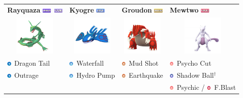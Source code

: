\documentclass[12pt]{beamer}
\newcommand{\flyingfull}{\includegraphics[height=0.2cm]{../../images/type/full/Flying.png}}
\newcommand{\dragonfull}{\includegraphics[height=0.2cm]{../../images/type/full/Dragon.png}}
\newcommand{\groundfull}{\includegraphics[height=0.2cm]{../../images/type/full/Ground.png}}
\newcommand{\psychicfull}{\includegraphics[height=0.2cm]{../../images/type/full/Psychic.png}}
\newcommand{\waterfull}{\includegraphics[height=0.2cm]{../../images/type/full/Water.png}}
\newcommand{\fightingsimp}{\includegraphics[height=0.2cm]{../../images/type/simplified/fighting.png}}
\newcommand{\dragonsimp}{\includegraphics[height=0.2cm]{../../images/type/simplified/dragon.png}}
\newcommand{\ghostsimp}{\includegraphics[height=0.2cm]{../../images/type/simplified/ghost.png}}
\newcommand{\psysimp}{\includegraphics[height=0.2cm]{../../images/type/simplified/psy.png}}
\newcommand{\groundsimp}{\includegraphics[height=0.2cm]{../../images/type/simplified/ground.png}}
\newcommand{\watersimp}{\includegraphics[height=0.2cm]{../../images/type/simplified/water.png}}
\begin{document}
\begin{frame}
\begin{footnotesize}
\begin{block}{}
\begin{center}
\begin{tabular}{p{3cm}p{3cm}p{3cm}p{3cm}} 
\textbf{Rayquaza} \hfill \dragonfull~\flyingfull  & \textbf{Kyogre} \hfill  \waterfull & \textbf{Groudon} \hfill \groundfull & \textbf{Mewtwo} \hfill \psychicfull \\ 
\multicolumn{1}{c}{\includegraphics[width=2cm]{../../images/pokemon/Rayquaza}} &   \multicolumn{1}{c}{\includegraphics[width=2cm]{../../images/pokemon/Kyogre} } &   \multicolumn{1}{c}{\includegraphics[width=2cm]{../../images/pokemon/Groudon} } &   \multicolumn{1}{c}{\includegraphics[width=2cm]{../../images/pokemon/Mewtwo} }   \\ 
 \dragonsimp~Dragon Tail &\watersimp~Waterfall & \groundsimp~Mud Shot  & \psysimp~Psycho Cut  \\
\dragonsimp~Outrage & \watersimp~Hydro Pump &  \groundsimp~Earthquake & \ghostsimp~Shadow Ball$^{\dag}$  \\    
& & & \psysimp~Psychic / \fightingsimp~F.Blast \\ 
\end{tabular}

\end{center}
\end{block}
\end{footnotesize}
\end{frame}
\end{document}
